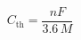 \documentclass[preview]{standalone}
\begin{document}
\[C_\text{th} = \frac{nF}{3.6\,M}\]
\end{document}
